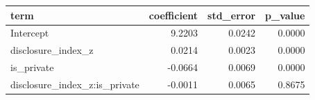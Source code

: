 \begin{tabular}{lrrr}
\toprule
term & coefficient & std\_error & p\_value \\
\midrule
Intercept & 9.2203 & 0.0242 & 0.0000 \\
disclosure\_index\_z & 0.0214 & 0.0023 & 0.0000 \\
is\_private & -0.0664 & 0.0069 & 0.0000 \\
disclosure\_index\_z:is\_private & -0.0011 & 0.0065 & 0.8675 \\
\bottomrule
\end{tabular}
